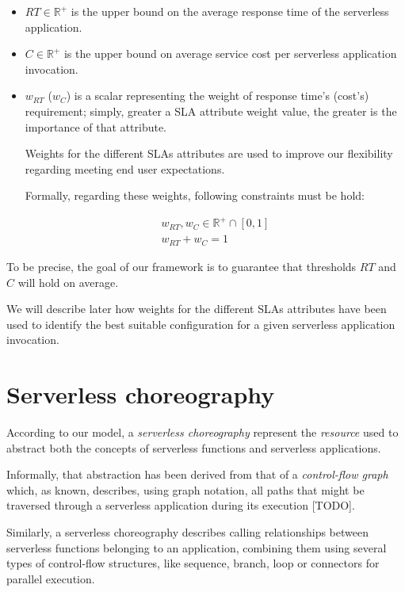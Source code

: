 \documentclass[12pt,a4paper]{report}
\theoremstyle{definition}
\begin{document}
\begin{itemize}
	\item $RT \in \mathbb{R}^+$ is the upper bound on the average
	response time of the serverless application.
	
	\item $C \in \mathbb{R}^+$ is the upper bound on average service cost per serverless application invocation.
	
	\item $w_{RT}$ ($w_{C}$) is a scalar representing the weight of response time's (cost's) requirement; simply, greater a SLA attribute weight value, the greater is the importance of that attribute. 
	
	Weights for the different SLAs attributes are used to improve our flexibility regarding meeting end user expectations. 
	
	Formally, regarding these weights, following constraints must be hold:
	
	\begin{eqnarray}
		w_{RT},w_{C} \in \mathbb{R}^+ \cap \left[ 0,1 \right] \\
		w_{RT} + w_{C} = 1
	\end{eqnarray}
\end{itemize}

To be precise, the goal of our framework is to guarantee that thresholds $RT$ and $C$ will hold on average.

We will describe later how weights for the different SLAs attributes have been used to identify the best suitable configuration for a given serverless application invocation.

\section{Serverless choreography}

According to our model, a \textit{serverless choreography} represent the \textit{resource} used to abstract both the concepts of serverless functions and serverless applications.

Informally, that abstraction has been derived from that of a \textit{control-flow graph} which, as known, describes, using graph notation, all paths that might be traversed through a serverless application during its execution [TODO]. 

Similarly, a serverless choreography describes calling relationships between serverless functions belonging to an application, combining them using several types of control-flow structures, like sequence, branch, loop or connectors for parallel execution. 
\end{document}
